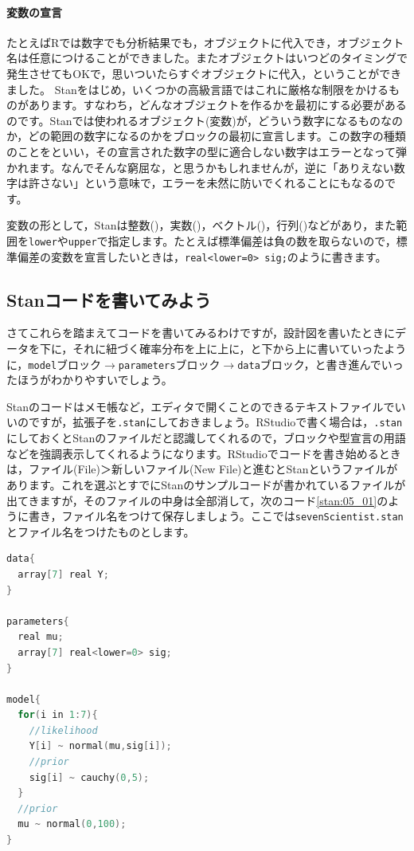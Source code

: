 \documentclass{ltjsbook}
\begin{document}
\paragraph{変数の宣言}
たとえばRでは数字でも分析結果でも，オブジェクトに代入でき，オブジェクト名は任意につけることができました。またオブジェクトはいつどのタイミングで発生させてもOKで，思いついたらすぐオブジェクトに代入，ということができました。
Stanをはじめ，いくつかの高級言語ではこれに厳格な制限をかけるものがあります。すなわち，どんなオブジェクトを作るかを最初にする必要があるのです。Stanでは使われるオブジェクト(変数)が，どういう数字になるものなのか，どの範囲の数字になるのかをブロックの最初に宣言します。この数字の種類のことをといい，その宣言された数字の型に適合しない数字はエラーとなって弾かれます。なんでそんな窮屈な，と思うかもしれませんが，逆に「ありえない数字は許さない」という意味で，エラーを未然に防いでくれることにもなるのです。

変数の形として，Stanは整数()，実数()，ベクトル()，行列()などがあり，また範囲を\texttt{lower}や\texttt{upper}で指定します。たとえば標準偏差は負の数を取らないので，標準偏差の変数を宣言したいときは，\verb|real<lower=0> sig;|のように書きます。
\subsection{Stanコードを書いてみよう}
さてこれらを踏まえてコードを書いてみるわけですが，設計図を書いたときにデータを下に，それに紐づく確率分布を上に上に，と下から上に書いていったように，\texttt{model}ブロック$\to$\texttt{parameters}ブロック$\to$\texttt{data}ブロック，と書き進んでいったほうがわかりやすいでしょう。

Stanのコードはメモ帳など，エディタで開くことのできるテキストファイルでいいのですが，拡張子を\texttt{.stan}にしておきましょう。RStudioで書く場合は，\texttt{.stan}にしておくとStanのファイルだと認識してくれるので，ブロックや型宣言の用語などを強調表示してくれるようになります。RStudioでコードを書き始めるときは，ファイル(File)＞新しいファイル(New File)と進むとStanというファイルがあります。これを選ぶとすでにStanのサンプルコードが書かれているファイルが出てきますが，そのファイルの中身は全部消して，次のコード\ref{stan:05_01}のように書き，ファイル名をつけて保存しましょう。ここでは\texttt{sevenScientist.stan} とファイル名をつけたものとします。

\begin{lstlisting}[language=C++,label={stan:05_01},caption={7人の科学者コード}]
data{
  array[7] real Y;
}

parameters{
  real mu;
  array[7] real<lower=0> sig;
}

model{
  for(i in 1:7){
    //likelihood
    Y[i] ~ normal(mu,sig[i]);
    //prior
    sig[i] ~ cauchy(0,5);
  }
  //prior
  mu ~ normal(0,100);
}

\end{lstlisting}
\end{document}
